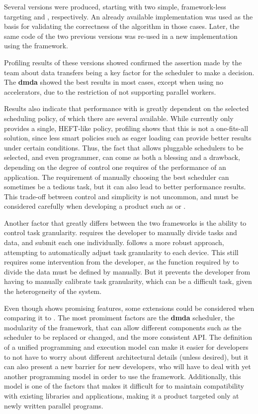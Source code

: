 \documentclass[main.tex]{subfiles}
\begin{document}
Several versions were produced, starting with two simple, framework-less targeting \cpus and \gpus, respectively. An already available implementation was used as the basis for validating the correctness of the algorithm in those cases. Later, the same code of the two previous versions was re-used in a new implementation using the \starpu framework.

Profiling results of these versions showed confirmed the assertion made by the \starpu team about data transfers being a key factor for the scheduler to make a decision. The \textbf{dmda} showed the best results in most cases, except when using no accelerators, due to the restriction of not supporting parallel workers.

Results also indicate that performance with \starpu is greatly dependent on the selected scheduling policy, of which there are several available. While \gama currently only provides a single, \acs{HEFT}-like policy, profiling shows that this is not a one-fits-all solution, since less smart policies such as eager loading can provide better results under certain conditions. Thus, the fact that \starpu allows pluggable schedulers to be selected, and even programmer, can come as both a blessing and a drawback, depending on the degree of control one requires of the performance of an application. The requirement of manually choosing the best scheduler can sometimes be a tedious task, but it can also lead to better performance results. This trade-off between control and simplicity is not uncommon, and must be considered carefully when developing a product such as \starpu or \gama.

Another factor that greatly differs between the two frameworks is the ability to control task granularity. \starpu requires the developer to manually divide tasks and data, and submit each one individually. \gama follows a more robust approach, attempting to automatically adjust task granularity to each device. This still requires some intervention from the developer, as the function required by \gama to divide the data must be defined by manually. But it prevents the developer from having to manually calibrate task granularity, which can be a difficult task, given the heterogeneity of the system.

Even though \gama shows promising features, some extensions could be considered when comparing it to \starpu. The most promiment factors are the \textbf{dmda} scheduler, the modularity of the framework, that can allow different components such as the scheduler to be replaced or changed, and the more consistent API. The definition of a unified programming and execution model can make it easier for developers to not have to worry about different architectural details (unless desired), but it can also present a new barrier for new developers, who will have to deal with yet another programming model in order to use the framework. Additionally, this model is one of the factors that makes it difficult for \gama to maintain compatibility with existing libraries and applications, making it a product targeted only at newly written parallel programs.
\end{document}
